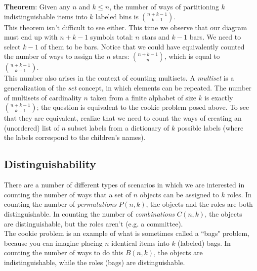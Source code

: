 \textbf{Theorem}: Given any $n$ and $k \leq n$, the number of ways of partitioning $k$ indistinguishable items into $k$ labeled bins is $\binom{n+k-1}{k-1}$.\\

This theorem isn't difficult to see either. This time we observe that our diagram must end up with $n + k - 1$ symbols total: $n$ stars and $k-1$ bars. We need to select $k-1$ of them to be bars. Notice that we could have equivalently counted the number of ways to assign the $n$ stars: $\binom{n+k-1}{n}$, which is equal to $\binom{n+k-1}{k-1}$.\\

This number also arises in the context of counting multisets. A \emph{multiset} is a generalization of the \emph{set} concept, in which elements can be repeated. The number of multisets of cardinality $n$ taken from a finite alphabet of size $k$ is exactly $\binom{n+k-1}{k-1}$; the question is equivalent to the cookie problem posed above. To see that they are equivalent, realize that we need to count the ways of creating an (unordered) list of $n$ subset labels from a dictionary of $k$ possible labels (where the labels correspond to the children's names).


\subsection{Distinguishability}
There are a number of different types of scenarios in which we are interested in counting the number of ways that a set of $n$ objects can be assigned to $k$ roles. In counting the number of \emph{permutations} $P(n, k)$, the objects and the roles are both distinguishable. In counting the number of \emph{combinations} $C(n, k)$, the objects are distinguishable, but the roles aren't (e.g. a committee).\\

The cookie problem is an example of what is sometimes called a ``bags" problem, because you can imagine placing $n$ identical items into $k$ (labeled) bags. In counting the number of ways to do this $B(n, k)$, the objects are indistinguishable, while the roles (bags) are distinguishable.\\

